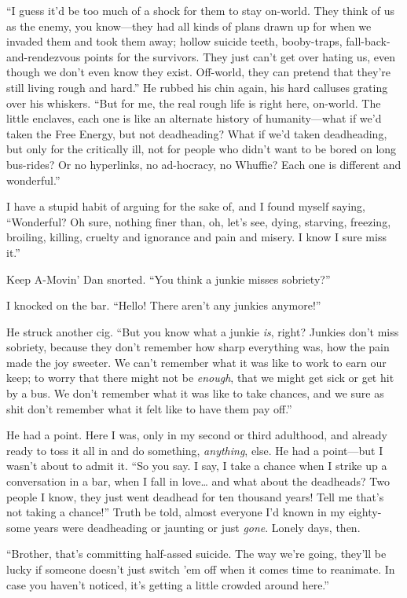 “I guess it'd be too much of a shock for them to stay on-world.
They think of us as the enemy, you know—they had all kinds of plans
drawn up for when we invaded them and took them away; hollow
suicide teeth, booby-traps, fall-back-and-rendezvous points for the
survivors. They just can't get over hating us, even though we don't
even know they exist. Off-world, they can pretend that they're
still living rough and hard.” He rubbed his chin again, his hard
calluses grating over his whiskers. “But for me, the real rough
life is right here, on-world. The little enclaves, each one is like
an alternate history of humanity—what if we'd taken the Free
Energy, but not deadheading? What if we'd taken deadheading, but
only for the critically ill, not for people who didn't want to be
bored on long bus-rides? Or no hyperlinks, no ad-hocracy, no
Whuffie? Each one is different and wonderful.”

I have a stupid habit of arguing for the sake of, and I found
myself saying, “Wonderful? Oh sure, nothing finer than, oh, let's
see, dying, starving, freezing, broiling, killing, cruelty and
ignorance and pain and misery. I know I sure miss it.”

Keep A-Movin' Dan snorted. “You think a junkie misses sobriety?”

I knocked on the bar. “Hello! There aren't any junkies anymore!”

He struck another cig. “But you know what a junkie \emph{is},
right? Junkies don't miss sobriety, because they don't remember how
sharp everything was, how the pain made the joy sweeter. We can't
remember what it was like to work to earn our keep; to worry that
there might not be \emph{enough}, that we might get sick or get hit
by a bus. We don't remember what it was like to take chances, and
we sure as shit don't remember what it felt like to have them pay
off.”

He had a point. Here I was, only in my second or third adulthood,
and already ready to toss it all in and do something,
\emph{anything}, else. He had a point—but I wasn't about to admit
it. “So you say. I say, I take a chance when I strike up a
conversation in a bar, when I fall in love… and what about the
deadheads? Two people I know, they just went deadhead for ten
thousand years! Tell me that's not taking a chance!” Truth be told,
almost everyone I'd known in my eighty-some years were deadheading
or jaunting or just \emph{gone}. Lonely days, then.

“Brother, that's committing half-assed suicide. The way we're
going, they'll be lucky if someone doesn't just switch 'em off when
it comes time to reanimate. In case you haven't noticed, it's
getting a little crowded around here.”

